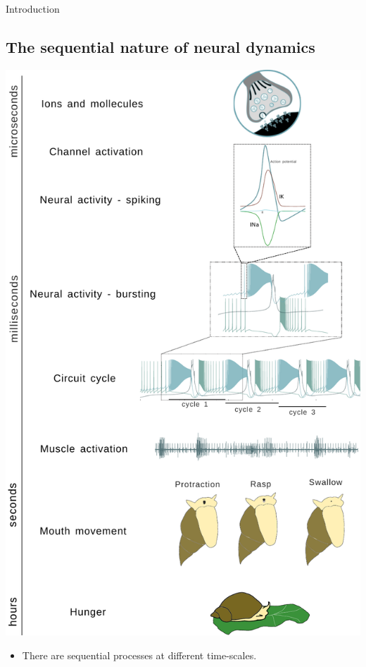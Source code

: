 \documentclass[aspectratio=43]{beamer}
\begin{document}
\begin{frame}{Introduction}
	\subsection{The sequential nature of neural dynamics}
		\begin{minipage}[b]{0.5\textwidth}
			\includegraphics[width=\textwidth]{intro/time scale/time-scale-feeding.pdf}
		\end{minipage}
		\begin{minipage}[b]{0.4\textwidth}
		    \begin{itemize}
		    	\item There are sequential processes at different time-scales.
		    \end{itemize}
		\end{minipage}
    

\end{frame}
\end{document}
